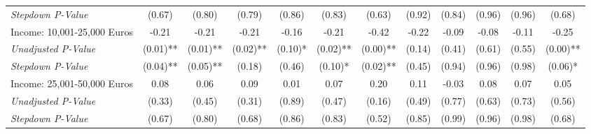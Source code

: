 \begin{tabular}{l c c c c c c c c c c c}
\quad \textit{Stepdown P-Value} & (0.67) & (0.80) & (0.79) & (0.86) & (0.83) & (0.63) & (0.92) & (0.84) & (0.96) & (0.96) & (0.68) \\
Income: 10,001-25,000 Euros & -0.21 & -0.21 & -0.21 & -0.16 & -0.21 & -0.42 & -0.22 & -0.09 & -0.08 & -0.11 & -0.25 \\
\quad \textit{Unadjusted P-Value} & (0.01)** & (0.01)** & (0.02)** & (0.10)* & (0.02)** & (0.00)** & (0.14) & (0.41) & (0.61) & (0.55) & (0.00)** \\
\quad \textit{Stepdown P-Value} & (0.04)** & (0.05)** & (0.18) & (0.46) & (0.10)* & (0.02)** & (0.45) & (0.94) & (0.96) & (0.98) & (0.06)* \\
Income: 25,001-50,000 Euros & 0.08 & 0.06 & 0.09 & 0.01 & 0.07 & 0.20 & 0.11 & -0.03 & 0.08 & 0.07 & 0.05 \\
\quad \textit{Unadjusted P-Value} & (0.33) & (0.45) & (0.31) & (0.89) & (0.47) & (0.16) & (0.49) & (0.77) & (0.63) & (0.73) & (0.56) \\
\quad \textit{Stepdown P-Value} & (0.67) & (0.80) & (0.68) & (0.86) & (0.83) & (0.52) & (0.85) & (0.99) & (0.96) & (0.98) & (0.68) \\
\bottomrule
\end{tabular}
